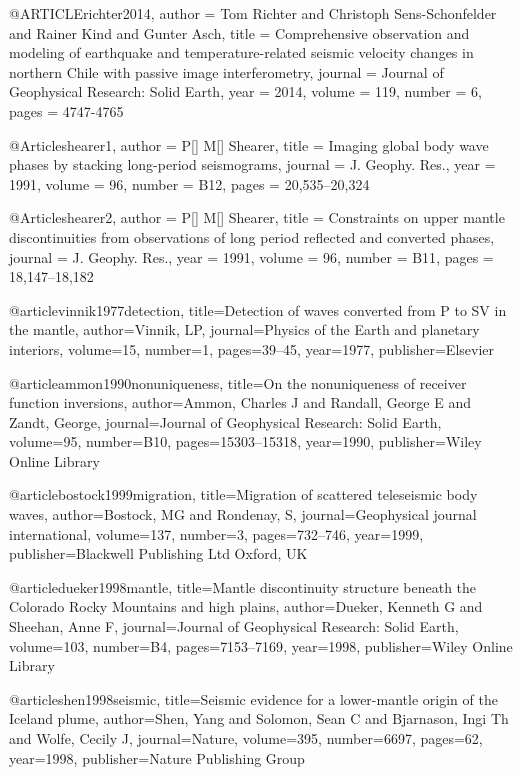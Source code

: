 @ARTICLE{richter2014,
  author = {Tom Richter and Christoph Sens-Schonfelder and  Rainer Kind and Gunter Asch},
  title = {Comprehensive observation and modeling of earthquake and temperature-related seismic velocity changes in northern Chile with passive image interferometry},
  journal = {Journal of Geophysical Research: Solid Earth},
  year = {2014},
  volume = {119},
  number = 6,
  pages = {4747-4765}
}



@Article{shearer1,
  author = 	 {P[] M[] Shearer},
  title = 	 {Imaging global body wave phases by stacking long-period seismograms},
  journal = 	 {J. Geophy. Res.},
  year = 	 1991,
  volume = 	 96,
  number = 	 {B12},
  pages = 	 {20,535--20,324}}

@Article{shearer2,
  author = 	 {P[] M[] Shearer},
  title = 	 {Constraints on upper mantle discontinuities from observations
	of long period reflected and converted phases},
  journal = 	 {J. Geophy. Res.},
  year = 	 1991,
  volume = 	 96,
  number = 	 {B11},
  pages = 	 {18,147--18,182}}


@article{vinnik1977detection,
  title={Detection of waves converted from P to SV in the mantle},
  author={Vinnik, LP},
  journal={Physics of the Earth and planetary interiors},
  volume={15},
  number={1},
  pages={39--45},
  year={1977},
  publisher={Elsevier}
}


@article{ammon1990nonuniqueness,
  title={On the nonuniqueness of receiver function inversions},
  author={Ammon, Charles J and Randall, George E and Zandt, George},
  journal={Journal of Geophysical Research: Solid Earth},
  volume={95},
  number={B10},
  pages={15303--15318},
  year={1990},
  publisher={Wiley Online Library}
}

@article{bostock1999migration,
  title={Migration of scattered teleseismic body waves},
  author={Bostock, MG and Rondenay, S},
  journal={Geophysical journal international},
  volume={137},
  number={3},
  pages={732--746},
  year={1999},
  publisher={Blackwell Publishing Ltd Oxford, UK}
}

@article{dueker1998mantle,
  title={Mantle discontinuity structure beneath the Colorado Rocky Mountains and high plains},
  author={Dueker, Kenneth G and Sheehan, Anne F},
  journal={Journal of Geophysical Research: Solid Earth},
  volume={103},
  number={B4},
  pages={7153--7169},
  year={1998},
  publisher={Wiley Online Library}
}

@article{shen1998seismic,
  title={Seismic evidence for a lower-mantle origin of the Iceland plume},
  author={Shen, Yang and Solomon, Sean C and Bjarnason, Ingi Th and Wolfe, Cecily J},
  journal={Nature},
  volume={395},
  number={6697},
  pages={62},
  year={1998},
  publisher={Nature Publishing Group}
}


